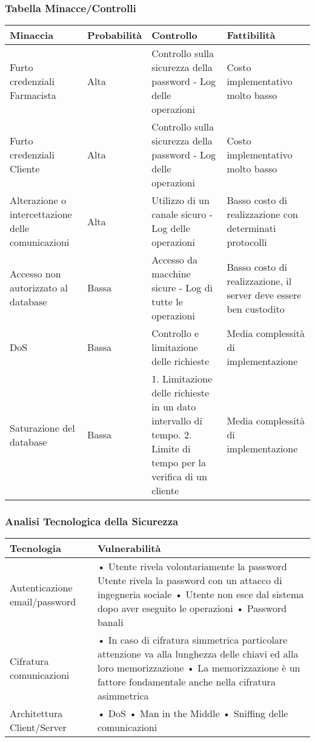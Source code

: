 \subsubsection{Tabella Minacce/Controlli}

\begin{tabular} {|P{3.5cm}|P{2.5cm}|P{6cm}|P{5cm}|}
\hline
  \textbf{Minaccia} & \textbf{Probabilità} & \textbf{Controllo} & \textbf{Fattibilità}\\
\hline
  Furto credenziali Farmacista & Alta & Controllo sulla sicurezza della password - Log delle operazioni & Costo implementativo molto basso\\
\hline
  Furto credenziali Cliente & Alta & Controllo sulla sicurezza della password - Log delle operazioni & Costo implementativo molto basso\\
\hline
  Alterazione o intercettazione delle comunicazioni & Alta & Utilizzo di un canale sicuro - Log delle operazioni & Basso costo di realizzazione con determinati protocolli\\
\hline
  Accesso non autorizzato al database & Bassa & Accesso da macchine sicure - Log di tutte le operazioni & Basso costo di realizzazione, il server deve essere ben custodito\\
\hline
  DoS & Bassa & Controllo e limitazione delle richieste & Media complessità di implementazione\\
\hline
  Saturazione del database & Bassa & 1. Limitazione delle richieste in un dato intervallo di tempo. 2. Limite di tempo per la verifica di un cliente & Media complessità di implementazione\\
\hline
\end{tabular}

\subsubsection{Analisi Tecnologica della Sicurezza}

\begin{tabular} {|P{4cm}|P{13cm}|}
\hline
  Tecnologia & Vulnerabilità\\
\hline
  Autenticazione email/password & • Utente rivela volontariamente la password
  Utente rivela la password con un attacco di ingegneria sociale \linebreak •
  Utente non esce dal sistema dopo aver eseguito le operazioni \linebreak •
  Password banali\\
\hline
  Cifratura comunicazioni & • In caso di cifratura simmetrica particolare
  attenzione va alla lunghezza delle chiavi ed alla loro memorizzazione
  \linebreak • La memorizzazione è un fattore fondamentale anche nella
  cifratura asimmetrica\\
\hline
  Architettura Client/Server & • DoS \linebreak • Man in the Middle \linebreak
  • Sniffing delle comunicazioni\\
\hline
\end{tabular}

